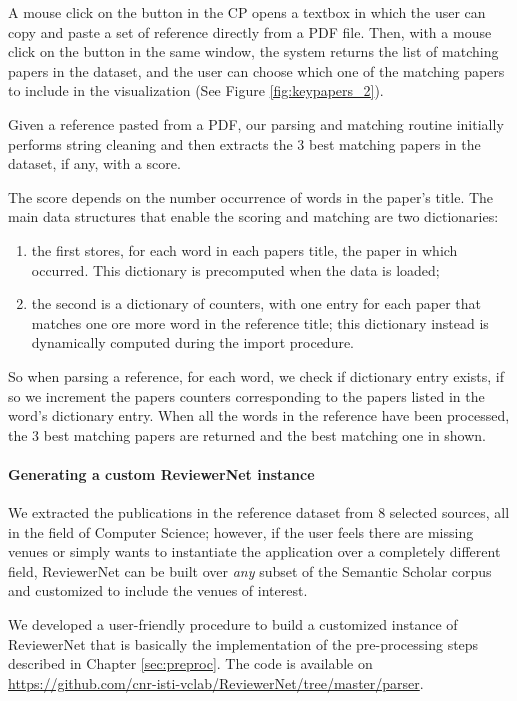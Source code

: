 A mouse click on the  button in the CP opens a textbox in which the user can copy and paste a set of reference directly from a PDF file. Then, with a mouse click on the  button in the same window, the system returns the list of matching papers in the dataset, and the user can choose which one of the matching papers to include in the visualization (See Figure \ref{fig:keypapers_2}).

Given a reference pasted from a PDF, our parsing and matching routine initially performs string cleaning and then extracts the 3 best matching papers in the dataset, if any, with a score.

The score depends on the number occurrence of words in the paper's title. The main data structures that enable the scoring and matching are two dictionaries:
\begin{enumerate}
    \item the first stores, for each word in each papers title, the paper in which occurred. This dictionary is precomputed when the data is loaded;  
    \item the second is a dictionary of counters, with one entry for each paper that matches one ore more word in the reference title; this dictionary instead is dynamically computed during the import procedure.
\end{enumerate}  

So when parsing a reference, for each word, we check if dictionary entry exists, if so we increment the papers counters corresponding to the papers listed in the word's dictionary entry. When all the words in the reference have been processed, the 3 best matching papers are returned and the best matching one in shown.

\paragraph*{Generating a custom ReviewerNet instance}

We extracted the publications in the reference dataset from 8 selected sources, all in the field of Computer Science; however, if the user feels there are missing venues or simply wants to instantiate the application over a completely different field, ReviewerNet can be built over \emph{any} subset of the Semantic Scholar corpus and customized to include the venues of interest.  

We developed a user-friendly procedure to build a customized instance of ReviewerNet that is basically the implementation of the pre-processing steps described in Chapter \ref{sec:preproc}. The code is available on \url{https://github.com/cnr-isti-vclab/ReviewerNet/tree/master/parser}.

